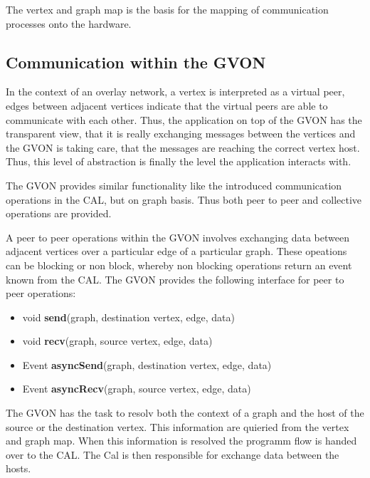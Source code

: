 The vertex and graph map is the basis for the mapping of communication
processes onto the hardware.


\subsection{Communication within the GVON}
In the context of an overlay network, a vertex is interpreted as a
virtual peer, edges between adjacent vertices indicate that the
virtual peers are able to communicate with each other. Thus, the
application on top of the GVON has the transparent view, that it is
really exchanging messages between the vertices and the GVON is taking
care, that the messages are reaching the correct vertex host. Thus, 
this level of abstraction is finally the level the application
interacts with.

The GVON provides similar functionality like the introduced
communication operations in the CAL, but on graph basis. Thus both
peer to peer and collective operations are provided.

A peer to peer operations within the GVON involves exchanging data
between adjacent vertices over a particular edge of a particular
graph.  These opeations can be blocking or non block, whereby non
blocking operations return an event known from the CAL.  The GVON
provides the following interface for peer to peer operations:

\begin{itemize}
  \item [] void \textbf{send}(graph, destination vertex, edge, data)
  \item [] void \textbf{recv}(graph, source vertex, edge, data)
  \item [] Event \textbf{asyncSend}(graph, destination vertex, edge, data)
  \item [] Event \textbf{asyncRecv}(graph, source vertex, edge, data)
\end{itemize}

The GVON has the task to resolv both the context of a graph and the
host of the source or the destination vertex. This information are
quieried from the vertex and graph map. When this information is
resolved the programm flow is handed over to the CAL. The Cal is then
responsible for exchange data between the hosts.


